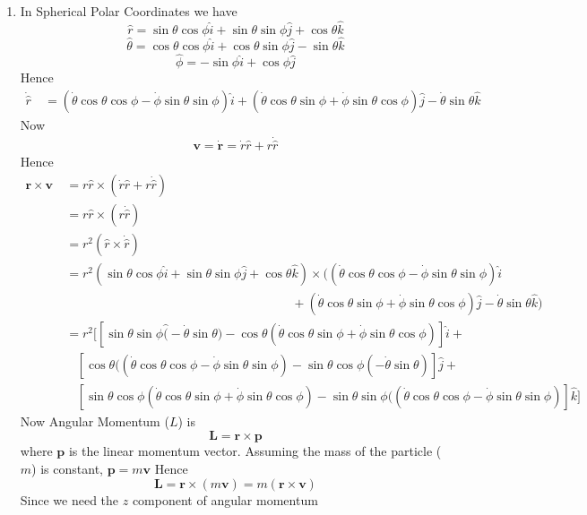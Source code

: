 \documentclass{article}
\begin{document}
\begin{enumerate}
	\item In Spherical Polar Coordinates we have$$\hat{r}=\sin\theta\cos\phi\hat{i}+\sin\theta\sin\phi\hat{j}+\cos\theta\hat{k}$$ $$\hat{\theta}=\cos \theta \cos \phi \hat{i}+\cos \theta \sin \phi \hat{j}-\sin \theta \hat{k}$$ $$\hat{\phi}=-\sin \phi \hat{i}+\cos \phi \hat{j}$$Hence\begin{align*}
		\dot{\hat{r}}\ &=(\dot{\theta}\cos \theta  \cos \phi-\dot{\phi}\sin \theta \sin \phi ) \hat{i}+(\dot{\theta}\cos \theta  \sin \phi+\dot{\phi}\sin \theta \cos \phi ) \hat{j}-\dot{\theta}\sin \theta  \hat{k}
	\end{align*}Now
\begin{align*}
	\boldsymbol{v}=\dot{\boldsymbol{r}}=\dot{r}\hat{r}+r\dot{\hat{r}}
\end{align*}Hence\begin{align*}
\boldsymbol{r}\times \boldsymbol{v}\ &=r\hat{r}\times(\dot{r}\hat{r}+r\dot{\hat{r}})\\
&=r\hat{r}\times (r\dot{\hat{r}})\\
&=r^2(\hat{r}\times\dot{\hat{r}})\\
&=r^2(\sin\theta\cos\phi\hat{i}+\sin\theta\sin\phi\hat{j}+\cos\theta\hat{k})\times((\dot{\theta}\cos \theta  \cos \phi-\dot{\phi}\sin \theta \sin \phi ) \hat{i}\\
&\qquad\qquad\qquad\qquad\qquad\qquad\qquad\qquad\qquad+(\dot{\theta}\cos \theta  \sin \phi+\dot{\phi}\sin \theta \cos \phi ) \hat{j}-\dot{\theta}\sin \theta  \hat{k})\\
&=r^2\Big[[\sin\theta\sin\phi\hat(-\dot{\theta}\sin \theta)-\cos\theta(\dot{\theta}\cos \theta  \sin \phi+\dot{\phi}\sin \theta \cos \phi )]\hat{i}+\\
& \ \ \ \  [\cos\theta((\dot{\theta}\cos \theta  \cos \phi-\dot{\phi}\sin \theta \sin \phi)-\sin\theta\cos\phi(-\dot{\theta}\sin \theta )]\hat{j}+\\
& \ \ \ \  [\sin\theta\cos\phi(\dot{\theta}\cos \theta  \sin \phi+\dot{\phi}\sin \theta \cos \phi )-\sin\theta\sin\phi((\dot{\theta}\cos \theta  \cos \phi-\dot{\phi}\sin \theta \sin \phi)]\hat{k}\Big]
\end{align*}Now Angular Momentum ($L$) is $$\boldsymbol{L}=\boldsymbol{r}\times\boldsymbol{p}$$where $\boldsymbol{p}$ is the linear momentum vector. Assuming the mass of the particle ($m$) is constant, $\boldsymbol{p}=m\boldsymbol{v}$ Hence$$\boldsymbol{L}=\boldsymbol{r}\times (m\boldsymbol{v})=m(\boldsymbol{r}\times\boldsymbol{v})$$Since we need the $z$ component of angular momentum\begin{align*}

\end{align*}
\end{enumerate}
\end{document}
